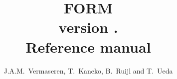 \documentclass[11pt]{report}
\newcommand{\emptypage}{\newpage \thispagestyle{empty} \tiny{\ } \normalsize}
\newcommand{\clearemptydoublepage}{\newpage{\pagestyle{empty}\cleardoublepage}}
\begin{document}
\begin{titlepage}
\title{\Huge FORM \\ \Large version \formmajorversion.\formminorversion \\
  \huge Reference manual}
\date{\formdate}
\author{J.A.M.~Vermaseren, T.~Kaneko, B.~Ruijl and T.~Ueda}
\end{titlepage}
\maketitle

\setcounter{page}{2}
\clearemptydoublepage
\emptypage
\clearemptydoublepage
{}
\setcounter{page}{1}
\clearemptydoublepage
\tableofcontents
\clearemptydoublepage
\emptypage
\clearemptydoublepage
{}
\setcounter{page}{1}
%





















%
\printindex
\end{document}
